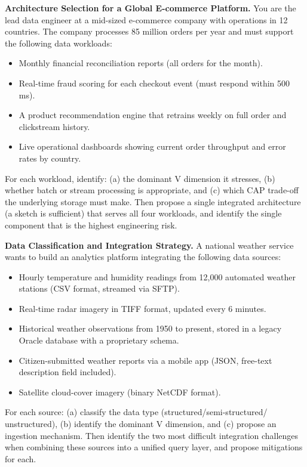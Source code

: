 \bigskip
{}

\dpr\textbf{Architecture Selection for a Global E-commerce Platform.}
You are the lead data engineer at a mid-sized e-commerce company with
operations in 12 countries. The company processes 85 million orders per
year and must support the following data workloads:
\begin{itemize}
  \item Monthly financial reconciliation reports (all orders for the month).
  \item Real-time fraud scoring for each checkout event (must respond
        within 500 ms).
  \item A product recommendation engine that retrains weekly on
        full order and clickstream history.
  \item Live operational dashboards showing current order throughput
        and error rates by country.
\end{itemize}
For each workload, identify: (a) the dominant V dimension it stresses,
(b) whether batch or stream processing is appropriate, and (c) which CAP
trade-off the underlying storage must make. Then propose a single
integrated architecture (a sketch is sufficient) that serves all four
workloads, and identify the single component that is the highest
engineering risk.

\dpr\textbf{Data Classification and Integration Strategy.}
A national weather service wants to build an analytics platform
integrating the following data sources:
\begin{itemize}
  \item Hourly temperature and humidity readings from 12,000 automated
        weather stations (CSV format, streamed via SFTP).
  \item Real-time radar imagery in TIFF format, updated every 6 minutes.
  \item Historical weather observations from 1950 to present, stored in
        a legacy Oracle database with a proprietary schema.
  \item Citizen-submitted weather reports via a mobile app (JSON, free-text
        description field included).
  \item Satellite cloud-cover imagery (binary NetCDF format).
\end{itemize}
For each source: (a) classify the data type (structured/semi-structured/
unstructured), (b) identify the dominant V dimension, and (c) propose
an ingestion mechanism. Then identify the two most difficult integration
challenges when combining these sources into a unified query layer, and
propose mitigations for each.

